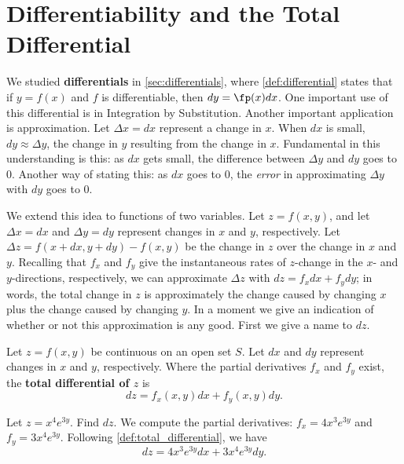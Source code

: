 \section{Differentiability and the Total Differential}\label{sec:total_differential}

We studied \textbf{differentials} in \autoref{sec:differentials}, where \autoref{def:differential}  states that if $y=f(x)$ and $f$ is differentiable, then $dy=\fp(x)dx$. One important use of this differential is in Integration by Substitution. Another important application is approximation. Let $\Delta x = dx$ represent a change in $x$. When $dx$ is small, $dy\approx \Delta y$, the change in $y$ resulting from the change in $x$. Fundamental in this understanding is this: as $dx$ gets small, the difference between $\Delta y$ and $dy$ goes to 0. Another way of stating this: as $dx$ goes to 0, the \emph{error} in approximating $\Delta y$ with $dy$ goes to 0.

We extend this idea to functions of two variables. Let $z=f(x,y)$, and let $\Delta x = dx$ and $\Delta y=dy$ represent changes in $x$ and $y$, respectively. Let $\Delta z = f(x+dx,y+dy) - f(x,y)$ be the change in $z$ over the change in $x$ and $y$. Recalling that $f_x$ and $f_y$ give the instantaneous rates of $z$-change in the $x$- and $y$-directions, respectively, we can approximate $\Delta z$ with $dz = f_xdx+f_ydy$; in words, the total change in $z$ is approximately the change caused by changing $x$ plus the change caused by changing $y$. In a moment we give an indication of whether or not this approximation is any good. First we give a name to $dz$.

\begin{definition}\label{def:total_differential}
Let $z=f(x,y)$ be continuous on an open set $S$. Let $dx$ and $dy$ represent changes in $x$ and $y$, respectively. Where the partial derivatives $f_x$ and $f_y$ exist, the \textbf{total differential of $z$} is 
\[dz = f_x(x,y)dx + f_y(x,y)dy.\]
\end{definition}


\begin{example}\label{ex_total_diff_10}
Let $z = x^4e^{3y}$. Find $dz$.
\solution
We compute the partial derivatives: $f_x = 4x^3e^{3y}$ and $f_y = 3x^4e^{3y}$. Following \autoref{def:total_differential}, we have
\[dz = 4x^3e^{3y}dx+3x^4e^{3y}dy.\]
\end{example}

